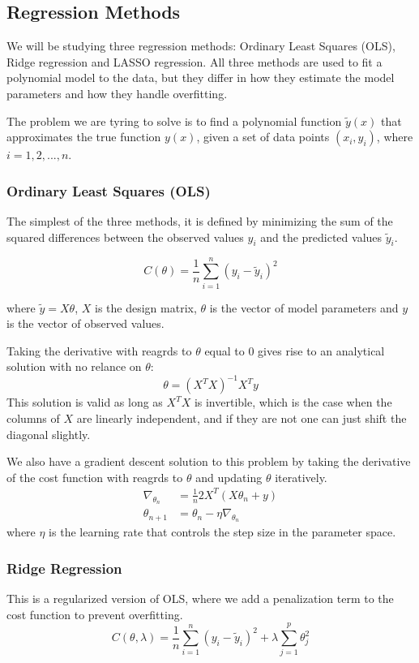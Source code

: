 \documentclass[amssymb,twocolumn,aps]{revtex4}
\begin{document}
\subsection{Regression Methods}
We will be studying three regression methods: Ordinary Least Squares (OLS), Ridge regression and LASSO regression.
All three methods are used to fit a polynomial model to the data, but they differ in how they estimate the model parameters and how they handle overfitting.

The problem we are tyring to solve is to find a polynomial function $\tilde{y}(x)$ that approximates the true function $y(x)$, given a set of data points $(x_i, y_i)$, where $i=1,2,...,n$.

\subsubsection{Ordinary Least Squares (OLS)}
The simplest of the three methods, it is defined by minimizing the sum of the squared differences between the observed values $y_i$ and the predicted values $\tilde{y}_i$.

$$C(\theta) = \frac{1}{n} \sum_{i=1}^{n} (y_i - \tilde{y}_i)^2$$

where $\tilde{y} = X\theta$, $X$ is the design matrix, $\theta$ is the vector of model parameters and $y$ is the vector of observed values.

Taking the derivative with reagrds to $\theta$ equal to $0$ gives rise to an analytical solution with no relance on $\theta$:
\begin{equation}
  \theta = (X^TX)^{-1}X^Ty  
\end{equation}
This solution is valid as long as $X^TX$ is invertible, which is the case when the columns of $X$ are linearly independent, and if they are not one can just shift the diagonal slightly.

We also have a gradient descent solution to this problem by taking the derivative of the cost function with reagrds to $\theta$ and updating $\theta$ iteratively.
\begin{align}
\nabla_{\theta_n} &= \frac{1}{n}2X^T(X\theta_n + y) \\
\theta_{n+1} &= \theta_n - \eta \nabla_{\theta_n}
\end{align}
where $\eta$ is the learning rate that controls the step size in the parameter space.

\subsubsection{Ridge Regression}
This is a regularized version of OLS, where we add a penalization term to the cost function to prevent overfitting.
$$
    C(\theta, \lambda) = \frac{1}{n} \sum_{i=1}^{n} (y_i - \tilde{y}_i)^2 + \lambda \sum_{j=1}^{p} \theta_j^2
$$
\end{document}
